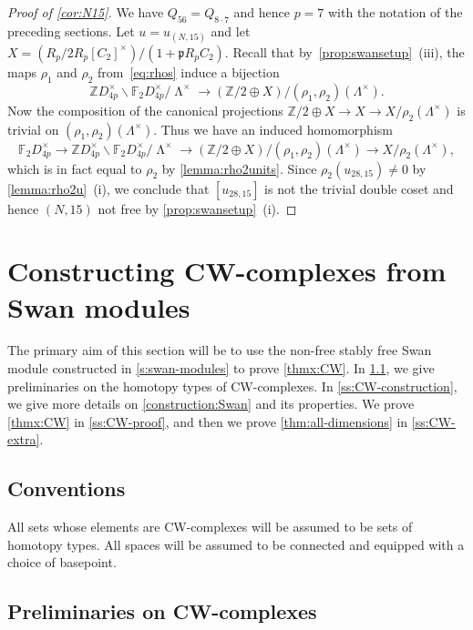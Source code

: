 \documentclass[11pt,leqno,a4paper]{amsart}
\newcommand{\Z}{\mathbb{Z}}
\newcommand{\F}{\mathbb{F}}
\DeclareMathOperator{\LL}{\Lambda}
\theoremstyle{definition}
\theoremstyle{remark}
\theoremstyle{custom}
\begin{document}
\begin{proof}[Proof of \cref{cor:N15}]
We have $Q_{56} = Q_{8 \cdot 7}$ and hence $p = 7$ with the notation of the preceding sections.
Let $u = u_{(N, 15)}$
and let $X = {(R_p/2R_p[C_2]^\times)}/({1+\mathfrak{p}R_pC_2})$.
Recall that by~\cref{prop:swansetup}~(iii), the maps $\rho_1$ and $\rho_2$ from~\cref{eq:rhos} induce a bijection
\[
\Z D_{4p}^\times \backslash \F_2 D_{4p}^\times /{\LL^\times}
\longrightarrow (\Z/2 \oplus X )/ (\rho_1,\rho_2)(\Lambda^\times).
\]
Now the composition of the canonical projections
$\Z/2 \oplus X \to
X
\to X/\rho_2(\Lambda^\times)
$ is trivial on $(\rho_1,\rho_2)(\Lambda^\times)$.
Thus we have an induced homomorphism
\[ \F_2 D_{4p}^\times \to \Z D_{4p}^\times \backslash \F_2 D_{4p}^\times /{\LL^\times } \to (\Z/2 \oplus X)/(\rho_1, \rho_2)(\Lambda^\times) \to X/\rho_2(\Lambda^\times),\]
which is in fact equal to $\rho_2$ by \cref{lemma:rho2units}.
Since $\rho_2(u_{28, 15}) \neq 0$ by \cref{lemma:rho2u}~(i), we conclude that $[u_{28, 15}]$ is not the trivial double coset and hence $(N, 15)$ not free by \cref{prop:swansetup}~(i).
\end{proof}

\section{Constructing CW-complexes from Swan modules} \label{s:CW}

The primary aim of this section will be to use the non-free stably free Swan module constructed in \cref{s:swan-modules} to prove \cref{thmx:CW}. In \cref{ss:CW-prelim}, we give preliminaries on the homotopy types of CW-complexes. In \cref{ss:CW-construction}, we give more details on \cref{construction:Swan} and its properties. We prove \cref{thmx:CW} in \cref{ss:CW-proof}, and then we prove \cref{thm:all-dimensions} in \cref{ss:CW-extra}.

\subsection*{Conventions} 
All sets whose elements are CW-complexes will be assumed to be sets of homotopy types. All spaces will be assumed to be connected and equipped with a choice of basepoint.

\subsection{Preliminaries on CW-complexes} \label{ss:CW-prelim}
\end{document}
